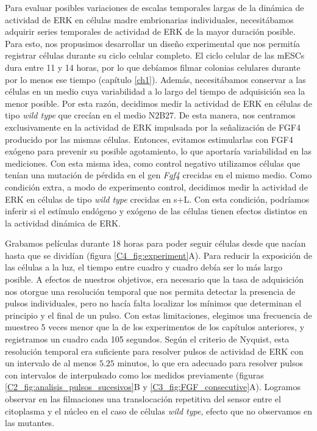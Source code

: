 \documentclass[./main.tex]{subfiles}
\begin{document}
Para evaluar posibles variaciones de escalas temporales largas de la dinámica de actividad de ERK en células madre embrionarias individuales, necesitábamos adquirir series temporales de actividad de ERK de la mayor duración posible. Para esto, nos propusimos desarrollar un diseño experimental que nos permitía registrar células durante su ciclo celular completo. El ciclo celular de las mESCs dura entre 11 y 14 horas, por lo que debíamos filmar colonias celulares durante por lo menos ese tiempo (capítulo \ref{ch1}). Además, necesitábamos conservar a las células en un medio cuya variabilidad a lo largo del tiempo de adquisición sea la menor posible. Por esta razón, decidimos medir la actividad de ERK en células de tipo \textit{wild type} que crecían en el medio N2B27. De esta manera, nos centramos exclusivamente en la actividad de ERK impulsada por la señalización de FGF4 producido por las mismas células. Entonces, evitamos estimularlas con FGF4 exógeno para prevenir su posible agotamiento, lo que aportaría variabilidad en las mediciones. Con esta misma idea, como control negativo utilizamos células que tenían una mutación de pérdida en el gen \textit{Fgf4} crecidas en el mismo medio. Como condición extra, a modo de experimento control, decidimos medir la actividad de ERK en células de tipo \textit{wild type} crecidas en s+L. Con esta condición, podríamos inferir si el estímulo endógeno y exógeno de las células tienen efectos distintos en la actividad dinámica de ERK.

Grabamos películas durante 18 horas para poder seguir células desde que nacían hasta que se dividían (figura \ref{C4_fig:experiment}A). Para reducir la exposición de las células a la luz, el tiempo entre cuadro y cuadro debía ser lo más largo posible. A efectos de nuestros objetivos, era necesario que la tasa de adquisición nos otorgue una resolución temporal que nos permita detectar la presencia de pulsos individuales, pero no hacía falta localizar los mínimos que determinan el principio y el final de un pulso. Con estas limitaciones, elegimos una frecuencia de muestreo 5 veces menor que la de los experimentos de los capítulos anteriores, y registramos un cuadro cada 105 segundos. Según el criterio de Nyquist, esta resolución temporal era suficiente para resolver pulsos de actividad de ERK con un intervalo de al menos $5.25$ minutos, lo que era adecuado para resolver pulsos con intervalos de interpulsado como los medidos previamente (figuras \ref{C2_fig:analisis_pulsos_sucesivos}B y \ref{C3_fig:FGF_consecutive}A). Logramos observar en las filmaciones una translocación repetitiva del sensor entre el citoplasma y el núcleo en el caso de células \textit{wild type}, efecto que no observamos en las mutantes.
\end{document}

